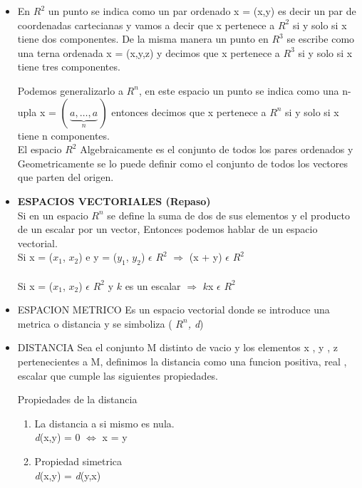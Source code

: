 \documentclass[a4paper,16pt]{article}
\begin{document}
\begin{itemize}
    \item En $R^{2}$ un punto se indica como un par ordenado x = (x,y) es decir	un par de coordenadas cartecianas y vamos a decir que x pertenece a $R^{2}$ si y solo si x  tiene dos componentes.
		De la misma manera un punto en $R^{3}$ se escribe como una terna ordenada x = (x,y,z) y 				decimos que x pertenece a $R^{3}$ si y solo si x tiene tres componentes.
		
		Podemos generalizarlo a $R^{n}$, en este espacio un punto se indica como una n-upla 
		x = $(\,\underbrace{a,\ldots, a}_{n}\,)$ entonces decimos que x pertenece a $R^{n}$ si y solo si x tiene n componentes.
\\		El espacio $R^{2}$ Algebraicamente es el conjunto de todos los pares ordenados y 						Geometricamente se lo puede definir como el conjunto de todos los vectores que parten 		del origen.

    \item \textbf{ESPACIOS VECTORIALES (Repaso)}
\\   Si en un espacio $R^{n}$ se define la suma de dos de sus elementos y el producto de un escalar por un vector, Entonces podemos hablar de un espacio vectorial.
\\   Si x = ($x_{1}$, $x_{2}$) e y = ($y_{1}$, $y_{2}$) $\epsilon$ $R^{2}$ $\Rightarrow$ (x + y) $\epsilon$ $R^{2}$ 
\\
\\
 Si x = ($x_{1}$, $x_{2}$) $\epsilon$ $R^{2}$ y $k$ es un escalar  $\Rightarrow$ $k$x  $\epsilon$ $R^{2}$ 

    \item ESPACION METRICO
Es un espacio vectorial donde se introduce una metrica o distancia y se simboliza  (\textit{ $R^{n}$, d})

    \item DISTANCIA
Sea el conjunto M distinto de vacio y  los elementos  x , y , z  pertenecientes a M, definimos la distancia como una funcion positiva, real , escalar que cumple las siguientes propiedades.

Propiedades de la distancia
\begin{enumerate}
\item La distancia a si mismo es nula.
\\ \textit d({x,y}) = 0 $\Longleftrightarrow$  x = y

\item Propiedad simetrica
\\ \textit d({x,y}) = \textit d({y,x})



\end{enumerate}
\end{itemize}
\end{document}
